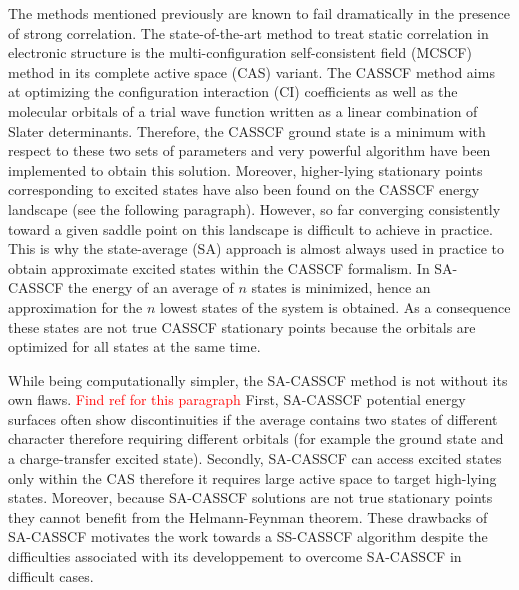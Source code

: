 \documentclass[aps,prb,reprint,showkeys,superscriptaddress]{revtex4-1}
\newcommand{\todo}[1]{\textcolor{red}{#1}}
\begin{document}
The methods mentioned previously are known to fail dramatically in the presence of strong correlation. \cite{Jensen_2017}
The state-of-the-art method to treat static correlation in electronic structure is the multi-configuration self-consistent field (MCSCF) method in its complete active space (CAS) variant. \cite{Roos_2016}
The CASSCF method aims at optimizing the configuration interaction (CI) coefficients as well as the molecular orbitals of a trial wave function written as a linear combination of Slater determinants. \cite{Helgaker_2000,Roos_2016}
Therefore, the CASSCF ground state is a minimum with respect to these two sets of parameters and very powerful algorithm have been implemented to obtain this solution. \cite{Roos_1980,Werner_1985,Sun_2017,Kreplin_2019,Kreplin_2020}
Moreover, higher-lying stationary points corresponding to excited states have also been found on the CASSCF energy landscape (see the following paragraph).
However, so far converging consistently toward a given saddle point on this landscape is difficult to achieve in practice.
This is why the state-average (SA) approach is almost always used in practice to obtain approximate excited states within the CASSCF formalism.
In SA-CASSCF the energy of an average of $n$ states is minimized, hence an approximation for the $n$ lowest states of the system is obtained.
As a consequence these states are not true CASSCF stationary points because the orbitals are optimized for all states at the same time.

While being computationally simpler, the SA-CASSCF method is not without its own flaws. \cite{Zaitsevskii_1994,Helmich-Paris_2019} \todo{Find ref for this paragraph}
First, SA-CASSCF potential energy surfaces often show discontinuities if the average contains two states of different character therefore requiring different orbitals (for example the ground state and a charge-transfer excited state). \cite{Zaitsevskii_1994}
Secondly, SA-CASSCF can access excited states only within the CAS therefore it requires large active space to target high-lying states.
Moreover, because SA-CASSCF solutions are not true stationary points they cannot benefit from the Helmann-Feynman theorem.
These drawbacks of SA-CASSCF motivates the work towards a SS-CASSCF algorithm despite the difficulties associated with its developpement to overcome SA-CASSCF in difficult cases.
\end{document}
